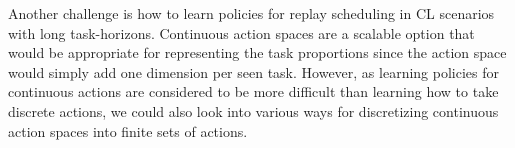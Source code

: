 Another challenge is how to learn policies for replay scheduling in CL scenarios with long task-horizons. Continuous action spaces are a scalable option that would be appropriate for representing the task proportions since the action space would simply add one dimension per seen task. 
However, as learning policies for continuous actions are considered to be more difficult than learning how to take discrete actions, we could also look into various ways for discretizing continuous action spaces into finite sets of actions.    



